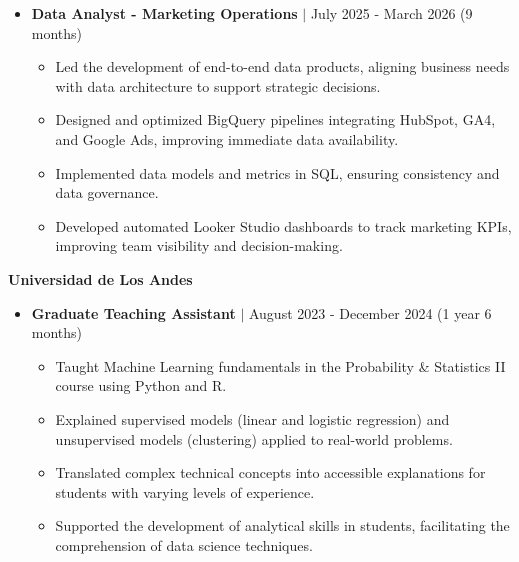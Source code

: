 \documentclass[9pt, letterpaper]{extarticle}
\begin{document}
        \vspace{10pt}

        \begin{itemize}[leftmargin=15pt, nosep]
            \item \textbf{Data Analyst - Marketing Operations} $\vert$ July 2025 - March 2026 (9 months)
            \begin{itemize}[leftmargin=15pt, label={--}, nosep]
                \item Led the development of end-to-end data products, aligning business needs with data architecture to support strategic decisions.
                \item Designed and optimized BigQuery pipelines integrating HubSpot, GA4, and Google Ads, improving immediate data availability.
                \item Implemented data models and metrics in SQL, ensuring consistency and data governance.
                \item Developed automated Looker Studio dashboards to track marketing KPIs, improving team visibility and decision-making.
            \end{itemize}
        \end{itemize}

        \vspace{10pt}

        \noindent \textbf{Universidad de Los Andes}

        \begin{itemize}[leftmargin=15pt, nosep]
            \item \textbf{Graduate Teaching Assistant} $\vert$ August 2023 - December 2024 (1 year 6 months)
            \begin{itemize}[leftmargin=15pt, label={--}, nosep]
                \item Taught Machine Learning fundamentals in the Probability \& Statistics II course using Python and R.
                \item Explained supervised models (linear and logistic regression) and unsupervised models (clustering) applied to real-world problems.
                \item Translated complex technical concepts into accessible explanations for students with varying levels of experience.
                \item Supported the development of analytical skills in students, facilitating the comprehension of data science techniques.
            \end{itemize}
        \end{itemize}
        
\end{document}
